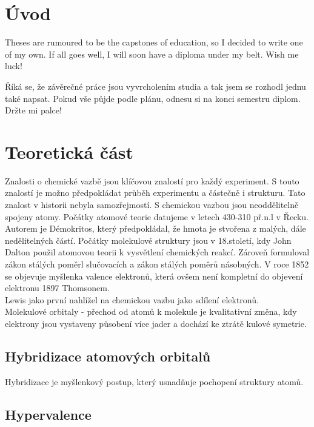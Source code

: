 \documentclass[
  digital, %
  table,   %
  lof,     %
  lot,     %
]{fithesis3}
\begin{document}
\chapter{Úvod}
Theses are rumoured to be the capstones of education, so I decided
to write one of my own. If all goes well, I will soon have a
diploma under my belt. Wish me luck!

\begin{otherlanguage}{czech}
Říká se, že závěrečné práce jsou vyvrcholením studia a tak jsem se
rozhodl jednu také napsat. Pokud vše půjde podle plánu, odnesu si
na konci semestru diplom. Držte mi palce!
\end{otherlanguage}



\chapter{Teoretická část}
Znalosti o chemické vazbě jsou klíčovou znalostí pro každý experiment. S touto znalostí je možno předpokládat průběh experimentu a částečně i strukturu. Tato znalost v historii nebyla samozřejmostí. S chemickou vazbou jsou neoddělitelně spojeny atomy. Počátky atomové teorie datujeme v letech 430-310 př.n.l v Řecku. Autorem je Démokritos, který předpokládal, že hmota je stvořena z malých, dále nedělitelných částí. Počátky molekulové struktury jsou v 18.století, kdy John Dalton použil atomovou teorii k vysvětlení chemických reakcí. Zároveň formuloval zákon stálých poměrl slučovacích a zákon stálých poměrů násobných. V roce 1852 se objevuje myšlenka valence elektronů, která ovšem není kompletní do objevení elektronu 1897 Thomsonem. \\
Lewis jako první nahlížel na chemickou vazbu jako sdílení elektronů. \cite{Munzarova1996thesis} \\

Molekulové orbitaly - přechod od atomů k molekule je kvalitativní změna, kdy elektrony jsou vystaveny působení více jader a dochází ke ztrátě kulové symetrie.  \cite{polak2000obecna}

\section{Hybridizace atomových orbitalů}
Hybridizace je myšlenkový postup,  který usnadňuje pochopení struktury atomů. 
\section{Hypervalence}
\end{document}
